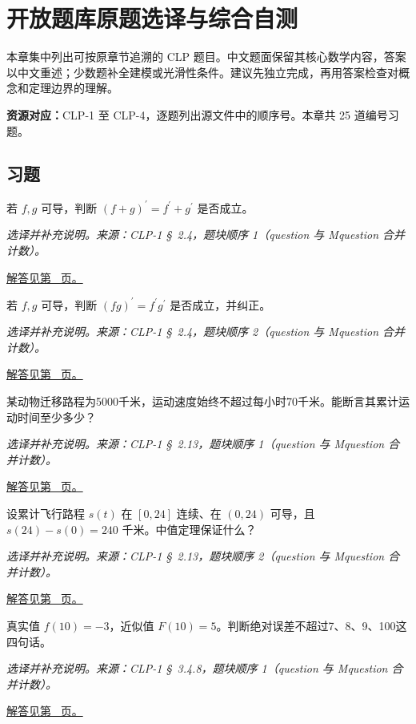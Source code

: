 \documentclass[12pt,fontset=fandol]{ctexart}
\begin{document}
\clearpage
\section{开放题库原题选译与综合自测}\label{sec:ch45}
本章集中列出可按原章节追溯的 CLP 题目。中文题面保留其核心数学内容，答案以中文重述；少数题补全建模或光滑性条件。建议先独立完成，再用答案检查对概念和定理边界的理解。

\textbf{资源对应：}CLP-1 至 CLP-4，逐题列出源文件中的顺序号。本章共 25 道编号习题。
\subsection{习题}
\begin{example}[求导的线性性]\label{ex:c45q1}
若 $f,g$ 可导，判断 $(f+g)^{\prime}=f^{\prime}+g^{\prime}$ 是否成立。
\par\textit{选译并补充说明。来源：CLP-1 \S~2.4，题块顺序 1（question 与 Mquestion 合并计数）。}\par\hyperref[ans:c45q1]{解答见第~\pageref{ans:c45q1} 页。}
\end{example}
\begin{example}[乘积求导的错误公式]\label{ex:c45q2}
若 $f,g$ 可导，判断 $(fg)^{\prime}=f^{\prime}g^{\prime}$ 是否成立，并纠正。
\par\textit{选译并补充说明。来源：CLP-1 \S~2.4，题块顺序 2（question 与 Mquestion 合并计数）。}\par\hyperref[ans:c45q2]{解答见第~\pageref{ans:c45q2} 页。}
\end{example}
\begin{example}[最高速度给出时间下界]\label{ex:c45q3}
某动物迁移路程为5000千米，运动速度始终不超过每小时70千米。能断言其累计运动时间至少多少？
\par\textit{选译并补充说明。来源：CLP-1 \S~2.13，题块顺序 1（question 与 Mquestion 合并计数）。}\par\hyperref[ans:c45q3]{解答见第~\pageref{ans:c45q3} 页。}
\end{example}
\begin{example}[平均变化率对应某一时刻]\label{ex:c45q4}
设累计飞行路程 $s(t)$ 在 $[0,24]$ 连续、在 $(0,24)$ 可导，且 $s(24)-s(0)=240$ 千米。中值定理保证什么？
\par\textit{选译并补充说明。来源：CLP-1 \S~2.13，题块顺序 2（question 与 Mquestion 合并计数）。}\par\hyperref[ans:c45q4]{解答见第~\pageref{ans:c45q4} 页。}
\end{example}
\begin{example}[误差上界不必最紧]\label{ex:c45q5}
真实值 $f(10)=-3$，近似值 $F(10)=5$。判断绝对误差不超过7、8、9、100这四句话。
\par\textit{选译并补充说明。来源：CLP-1 \S~3.4.8，题块顺序 1（question 与 Mquestion 合并计数）。}\par\hyperref[ans:c45q5]{解答见第~\pageref{ans:c45q5} 页。}
\end{example}
\end{document}
